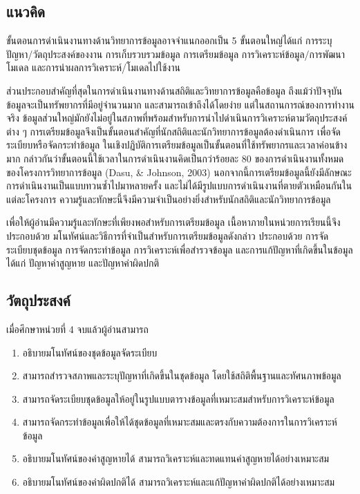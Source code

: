 \documentclass[
  letterpaper,
  DIV=11,
  numbers=noendperiod]{scrreprt}
\providecommand{\tightlist}{%
  \setlength{\itemsep}{0pt}\setlength{\parskip}{0pt}}\usepackage{longtable,booktabs,array}
\begin{document}
\hypertarget{uxe41uxe19uxe27uxe04uxe14}{%
\subsection*{\texorpdfstring{\textbf{แนวคิด}}{แนวคิด}}\label{uxe41uxe19uxe27uxe04uxe14}}

ขั้นตอนการดำเนินงานทางด้านวิทยาการข้อมูลอาจจำแนกออกเป็น 5 ขั้นตอนใหญ่ได้แก่
การระบุปัญหา/วัตถุประสงค์ของงาน การเก็บรวบรวมข้อมูล การเตรียมข้อมูล
การวิเคราะห์ข้อมูล/การพัฒนาโมเดล และการนำผลการวิเคราะห์/โมเดลไปใช้งาน

ส่วนประกอบสำคัญที่สุดในการดำเนินงานทางด้านสถิติและวิทยาการข้อมูลคือข้อมูล
ถึงแม้ว่าปัจจุบันข้อมูลจะเป็นทรัพยากรที่มีอยู่จำนวนมาก และสามารถเข้าถึงได้โดยง่าย
แต่ในสถานการณ์ของการทำงานจริง
ข้อมูลส่วนใหญ่มักยังไม่อยู่ในสภาพที่พร้อมสำหรับการนำไปดำเนินการวิเคราะห์ตามวัตถุประสงค์ต่าง
ๆ การเตรียมข้อมูลจึงเป็นขั้นตอนสำคัญที่นักสถิติและนักวิทยาการข้อมูลต้องดำเนินการ
เพื่อจัดระเบียบหรือจัดกระทำข้อมูล
ในเชิงปฏิบัติการเตรียมข้อมูลเป็นขั้นตอนที่ใช้ทรัพยากรและเวลาค่อนข้างมาก
กล่าวกันว่าขั้นตอนนี้ใช้เวลาในการดำเนินงานคิดเป็นกว่าร้อยละ 80
ของการดำเนินงานทั้งหมดของโครงการวิทยาการข้อมูล (Dasu, \& Johnson, 2003)
นอกจากนี้การเตรียมข้อมูลนี้ยังมีลักษณะการดำเนินงานเป็นแบบทวนซ้ำไปมาหลายครั้ง
และไม่ได้มีรูปแบบการดำเนินงานที่ตายตัวเหมือนกันในแต่ละโครงการ
ความรู้และทักษะนี้จึงมีความจำเป็นอย่างยิ่งสำหรับนักสถิติและนักวิทยาการข้อมูล

เพื่อให้ผู้อ่านมีความรู้และทักษะที่เพียงพอสำหรับการเตรียมข้อมูล
เนื้อหาภายในหน่วยการเรียนนี้จึงประกอบด้วย
มโนทัศน์และวิธีการที่จำเป็นสำหรับการเตรียมข้อมูลดังกล่าว ประกอบด้วย การจัดระเบียบชุดข้อมูล
การจัดกระทำข้อมูล การวิเคราะห์เพื่อสำรวจข้อมูล และการแก้ปัญหาที่เกิดขึ้นในข้อมูลได้แก่
ปัญหาค่าสูญหาย และปัญหาค่าผิดปกติ

\hypertarget{uxe27uxe15uxe16uxe1buxe23uxe30uxe2auxe07uxe04}{%
\subsection*{\texorpdfstring{\textbf{วัตถุประสงค์}}{วัตถุประสงค์}}\label{uxe27uxe15uxe16uxe1buxe23uxe30uxe2auxe07uxe04}}

เมื่อศึกษาหน่วยที่ 4 จบแล้วผู้อ่านสามารถ

\begin{enumerate}
\def\labelenumi{\arabic{enumi}.}
\tightlist
\item
  อธิบายมโนทัศน์ของชุดข้อมูลจัดระเบียบ
\item
  สามารถสำรวจสภาพและระบุปัญหาที่เกิดขึ้นในชุดข้อมูล โดยใช้สถิติพื้นฐานและทัศนภาพข้อมูล
\item
  สามารถจัดระเบียบชุดข้อมูลให้อยู่ในรูปแบบตารางข้อมูลที่เหมาะสมสำหรับการวิเคราะห์ข้อมูล
\item
  สามารถจัดกระทำข้อมูลเพื่อให้ได้ชุดข้อมูลที่เหมาะสมและตรงกับความต้องการในการวิเคราะห์ข้อมูล
\item
  อธิบายมโนทัศน์ของค่าสูญหายได้ สามารถวิเคราะห์และทดแทนค่าสูญหายได้อย่างเหมาะสม
\item
  อธิบายมโนทัศน์ของค่าผิดปกติได้ สามารถวิเคราะห์และแก้ปัญหาค่าผิดปกติได้อย่างเหมาะสม
\end{enumerate}
\end{document}
